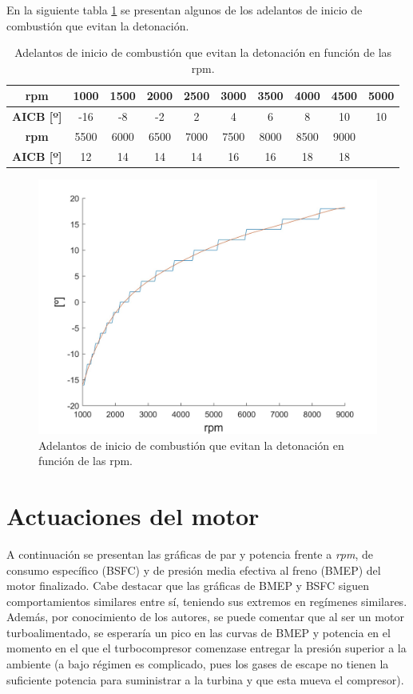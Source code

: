 En la siguiente tabla \ref{tab:rpm_AICB} se presentan algunos de los adelantos de inicio de combustión que evitan la detonación.
\begin{table}[htbp]
    \centering
    \begin{tabular}{|c|c|c|c|c|c|c|c|c|c|}
        \hline
        \textbf{rpm}       & 1000 & 1500 & 2000 & 2500 & 3000 & 3500 & 4000 & 4500 & 5000 \\ 
        \hline
        \textbf{AICB [º]} & -16  & -8   & -2   & 2    & 4    & 6    & 8    & 10   & 10   \\ 
        \hline
        \textbf{rpm}       & 5500 & 6000 & 6500 & 7000 & 7500 & 8000 & 8500 & 9000 & \\ 
        \hline
        \textbf{AICB [º]} & 12   & 14   & 14   & 14   & 16   & 16   & 18   & 18    & \\ 
        \hline
    \end{tabular}
    \caption{Adelantos de inicio de combustión que evitan la detonación en función de las rpm.}
    \label{tab:rpm_AICB}
\end{table}

\begin{figure}[H]
    \centering
    \includegraphics[width=0.6\linewidth]{Figures/01/regresion_aicb.jpg}
    \caption{Adelantos de inicio de combustión que evitan la detonación en función de las rpm.}
    \label{fig:RPM_aicb}
\end{figure}

\section{Actuaciones del motor} \label{s:section_06}

A continuación se presentan las gráficas de par y potencia frente a \textit{rpm}, de consumo específico (BSFC) y de presión media efectiva al freno (BMEP) del motor finalizado. Cabe destacar que las gráficas de BMEP y BSFC siguen comportamientos similares entre sí, teniendo sus extremos en regímenes similares. Además, por conocimiento de los autores, se puede comentar que al ser un motor turboalimentado, se esperaría un pico en las curvas de BMEP y potencia en el momento en el que el turbocompresor comenzase entregar la presión superior a la ambiente (a bajo régimen es complicado, pues los gases de escape no tienen la suficiente potencia para suministrar a la turbina y que esta mueva el compresor).

